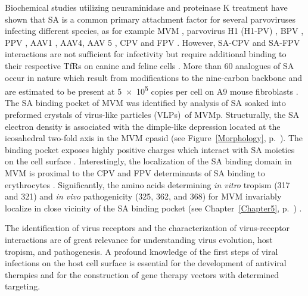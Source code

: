 Biochemical studies utilizing neuraminidase and proteinase K treatment have shown that SA is a common primary attachment factor for several parvoviruses infecting different species, as for example MVM \cite{pmid3296697, pmid16415031}, parvovirus H1 (H1-PV) \cite{pmid22258256}, BPV \cite{pmid15750863, pmid9747725, pmid15269359}, PPV \cite{pmid20484503}, AAV1 \cite{pmid16943302, pmid16940521}, AAV4, AAV 5 \cite{pmid15761263, pmid11435568, pmid11262413, pmid16409121}, CPV and FPV \cite{pmid1329321, pmid7975239}. However, SA-CPV and SA-FPV interactions are not sufficient for infectivity but require additional binding to their respective TfRs on canine and feline cells \cite{pmid1329321, pmid12525605, pmid11264378, pmid12885908}. More than 60 analogues of SA occur in nature which result from modifications to the nine-carbon backbone \cite{pmid17072005} and are estimated to be present at 5~$\times$~10\textsuperscript{5} copies per cell on A9 mouse fibroblasts \cite{pmid20517, pmid6602221}. The SA binding pocket of MVM was identified by analysis of SA soaked into preformed crystals of virus-like particles (VLPs)\footnotemark~of MVMp. Structurally, the SA electron density is associated with the dimple-like depression located at the icosahedral two-fold axis in the MVM cpasid (see Figure~\ref{Morphology}, p.~\pageref{Morphology}). The binding pocket exposes highly positive charges which interact with SA moieties on the cell surface \cite{pmid16415031}. Interestingly, the localization of the SA binding domain in MVM is proximal to the CPV and FPV determinants of SA binding to erythrocytes \cite{pmid7645206, pmid8392729, pmid1329321, pmid10884355}. Significantly, the amino acids determining \textit{in vitro} tropism (317 and 321) and \textit{in vivo} pathogenicity (325, 362, and 368) for MVM invariably localize in close vicinity of the SA binding pocket (see Chapter~\ref{Chapter5}, p.~\pageref{Chapter5}) \cite{pmid16103145}.                  

The identification of virus receptors and the characterization of virus-receptor interactions are of great relevance for understanding virus evolution, host tropism, and pathogenesis. A profound knowledge of the first steps of viral infections on the host cell surface is essential for the development of antiviral therapies and for the construction of gene therapy vectors with determined targeting.    



